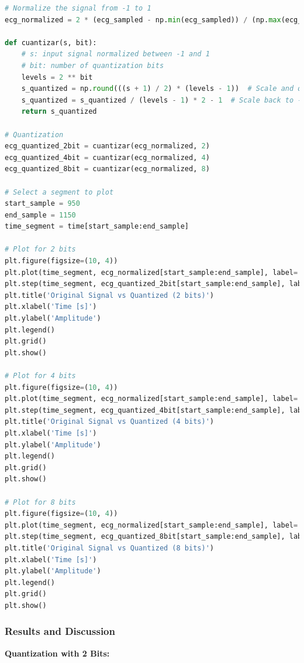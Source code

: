 \documentclass[10pt]{article}
\theoremstyle{definition}
\theoremstyle{remark}
\theoremstyle{definition}
\numberwithin{equation}{prob}
\begin{document}
\begin{lstlisting}[language=Python]
# Normalize the signal from -1 to 1
ecg_normalized = 2 * (ecg_sampled - np.min(ecg_sampled)) / (np.max(ecg_sampled) - np.min(ecg_sampled)) - 1

def cuantizar(s, bit):
    # s: input signal normalized between -1 and 1
    # bit: number of quantization bits
    levels = 2 ** bit
    s_quantized = np.round(((s + 1) / 2) * (levels - 1))  # Scale and quantize
    s_quantized = s_quantized / (levels - 1) * 2 - 1  # Scale back to -1 and 1
    return s_quantized

# Quantization
ecg_quantized_2bit = cuantizar(ecg_normalized, 2)
ecg_quantized_4bit = cuantizar(ecg_normalized, 4)
ecg_quantized_8bit = cuantizar(ecg_normalized, 8)

# Select a segment to plot
start_sample = 950
end_sample = 1150
time_segment = time[start_sample:end_sample]

# Plot for 2 bits
plt.figure(figsize=(10, 4))
plt.plot(time_segment, ecg_normalized[start_sample:end_sample], label='Original', alpha=0.7)
plt.step(time_segment, ecg_quantized_2bit[start_sample:end_sample], label='Quantized (2 bits)', where='mid')
plt.title('Original Signal vs Quantized (2 bits)')
plt.xlabel('Time [s]')
plt.ylabel('Amplitude')
plt.legend()
plt.grid()
plt.show()

# Plot for 4 bits
plt.figure(figsize=(10, 4))
plt.plot(time_segment, ecg_normalized[start_sample:end_sample], label='Original', alpha=0.7)
plt.step(time_segment, ecg_quantized_4bit[start_sample:end_sample], label='Quantized (4 bits)', where='mid')
plt.title('Original Signal vs Quantized (4 bits)')
plt.xlabel('Time [s]')
plt.ylabel('Amplitude')
plt.legend()
plt.grid()
plt.show()

# Plot for 8 bits
plt.figure(figsize=(10, 4))
plt.plot(time_segment, ecg_normalized[start_sample:end_sample], label='Original', alpha=0.7)
plt.step(time_segment, ecg_quantized_8bit[start_sample:end_sample], label='Quantized (8 bits)', where='mid')
plt.title('Original Signal vs Quantized (8 bits)')
plt.xlabel('Time [s]')
plt.ylabel('Amplitude')
plt.legend()
plt.grid()
plt.show()
\end{lstlisting}

\subsubsection*{Results and Discussion}

\textbf{Quantization with 2 Bits:}
\end{document}
